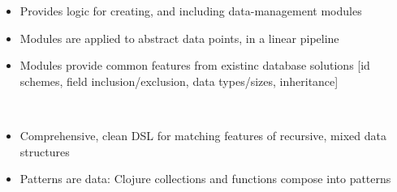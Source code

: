 



\medskip



\begin{itemize}
    \item Provides logic for creating, and including data-management modules
    \item Modules are applied to abstract data points, in a linear pipeline
    \item Modules provide common features from existinc database solutions [id schemes, field inclusion/exclusion, data types/sizes, inheritance]
\end{itemize}

\divider


\vspace{-0.2cm}
\\
\vspace{0.2cm}

\begin{itemize}
    \item Comprehensive, clean DSL for matching features of recursive, mixed data structures
    \item Patterns are data: Clojure collections and functions compose into patterns
\end{itemize}


